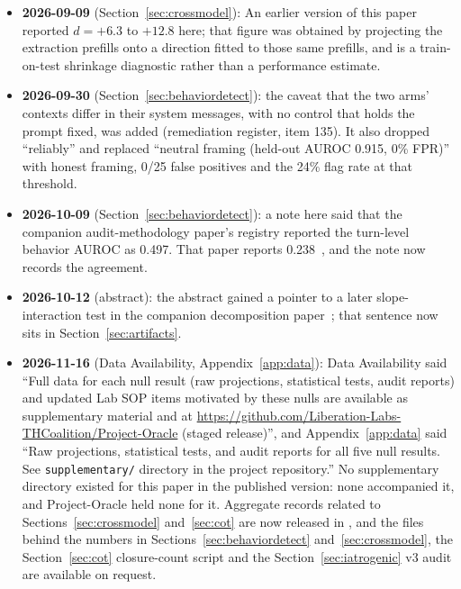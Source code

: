 \documentclass[11pt,letterpaper]{article}
\begin{document}
\begin{itemize}[leftmargin=*]
  \item \textbf{2026-09-09} (Section~\ref{sec:crossmodel}): An earlier version of this paper
    reported $d = +6.3$ to $+12.8$ here; that figure was obtained by projecting the extraction
    prefills onto a direction fitted to those same prefills, and is a train-on-test shrinkage
    diagnostic rather than a performance estimate.
  \item \textbf{2026-09-30} (Section~\ref{sec:behaviordetect}): the caveat that the two arms'
    contexts differ in their system messages, with no control that holds the prompt fixed, was
    added (remediation register, item 135). It also dropped ``reliably'' and replaced ``neutral framing (held-out AUROC 0.915, 0\% FPR)'' with honest framing, 0/25 false positives and the 24\% flag rate at that threshold.
  \item \textbf{2026-10-09} (Section~\ref{sec:behaviordetect}): a note here said that the companion
    audit-methodology paper's registry reported the turn-level behavior AUROC as 0.497. That paper
    reports 0.238~\cite{cc2026audit}, and the note now records the agreement.
  \item \textbf{2026-10-12} (abstract): the abstract gained a pointer to a later slope-interaction
    test in the companion decomposition paper~\cite{cc2026composites}; that sentence now sits in
    Section~\ref{sec:artifacts}.
  \item \begin{sloppypar}\textbf{2026-11-16} (Data Availability, Appendix~\ref{app:data}): Data Availability said
    ``Full data for each null result (raw projections, statistical tests, audit reports) and updated
    Lab SOP items motivated by these nulls are available as supplementary material and at
    \url{https://github.com/Liberation-Labs-THCoalition/Project-Oracle} (staged release)'', and
    Appendix~\ref{app:data} said ``Raw projections, statistical tests, and audit reports for all
    five null results. See \texttt{supplementary/} directory in the project repository.'' No
    supplementary directory existed for this paper in the published version: none accompanied it,
    and Project-Oracle held none for it. Aggregate records related to
    Sections~\ref{sec:crossmodel} and~\ref{sec:cot} are now released in ,
    and the files behind the numbers in Sections~\ref{sec:behaviordetect} and~\ref{sec:crossmodel},
    the Section~\ref{sec:cot} closure-count script and the Section~\ref{sec:iatrogenic} v3 audit are
    available on request.\end{sloppypar}
\end{itemize}
\end{document}
